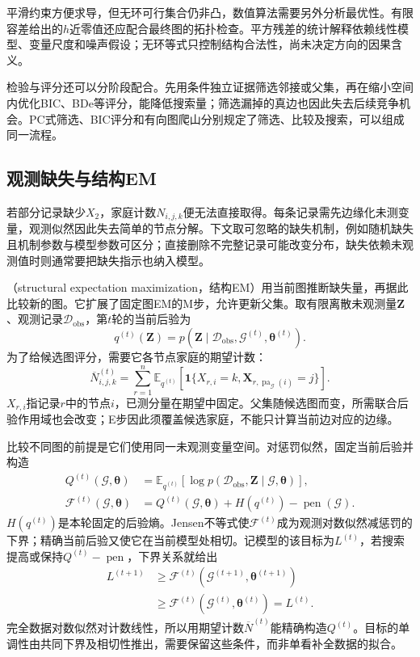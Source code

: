 平滑约束方便求导，但无环可行集合仍非凸，数值算法需要另外分析最优性。有限容差给出的$h$近零值还应配合最终图的拓扑检查。平方残差的统计解释依赖线性模型、变量尺度和噪声假设；无环等式只控制结构合法性，尚未决定方向的因果含义。

检验与评分还可以分阶段配合。先用条件独立证据筛选邻接或父集，再在缩小空间内优化BIC、BDe等评分，能降低搜索量；筛选漏掉的真边也因此失去后续竞争机会。PC式筛选、BIC评分和有向图爬山分别规定了筛选、比较及搜索，可以组成同一流程。

\subsection{观测缺失与结构EM}
\label{sec:pgm-structure-learning-structural-em}

若部分记录缺少$X_2$，家庭计数$N_{i,j,k}$便无法直接取得。每条记录需先边缘化未测变量，观测似然因此失去简单的节点分解。下文取可忽略的缺失机制，例如随机缺失且机制参数与模型参数可区分；直接删除不完整记录可能改变分布，缺失依赖未观测值时则通常要把缺失指示也纳入模型。

（structural expectation maximization，结构EM）用当前图推断缺失量，再据此比较新的图。它扩展了固定图EM的M步，允许更新父集。取有限离散未观测量$\bm{Z}$、观测记录$\mathcal{D}_{\mathrm{obs}}$，第$t$轮的当前后验为
\[
  q^{(t)}(\bm{Z})
  =p(\bm{Z}\mid\mathcal{D}_{\mathrm{obs}},
                  \mathcal{G}^{(t)},\bm{\theta}^{(t)}).
\]
为了给候选图评分，需要它各节点家庭的期望计数：
\[
  \overline N_{i,j,k}^{(t)}
  =\sum_{r=1}^{n}
    \mathbb{E}_{q^{(t)}}\!
      \left[\mathbf{1}\{X_{r,i}=k,
        \bm{X}_{r,\operatorname{pa}_{\mathcal{G}}(i)}=j\}\right].
\]
$X_{r,i}$指记录$r$中的节点$i$，已测分量在期望中固定。父集随候选图而变，所需联合后验作用域也会改变；E步因此须覆盖候选家庭，不能只计算当前边对应的边缘。

比较不同图的前提是它们使用同一未观测变量空间。对惩罚似然，固定当前后验并构造
\begin{equation}
  \begin{aligned}
    Q^{(t)}(\mathcal{G},\bm{\theta})
      &=\mathbb{E}_{q^{(t)}}[
          \log p(\mathcal{D}_{\mathrm{obs}},\bm{Z}
                     \mid\mathcal{G},\bm{\theta})],\\
    \mathcal{F}^{(t)}(\mathcal{G},\bm{\theta})
      &=Q^{(t)}(\mathcal{G},\bm{\theta})+H(q^{(t)})
        -\operatorname{pen}(\mathcal{G}).
  \end{aligned}
  \label{eq:pgm-structure-learning-sem-bound}
\end{equation}
$H(q^{(t)})$是本轮固定的后验熵。Jensen不等式使$\mathcal{F}^{(t)}$成为观测对数似然减惩罚的下界；精确当前后验又使它在当前模型处相切。记模型的该目标为$L^{(t)}$，若搜索提高或保持$Q^{(t)}-\operatorname{pen}$，下界关系就给出
\[
  \begin{aligned}
    L^{(t+1)}
    &\geq \mathcal{F}^{(t)}(\mathcal{G}^{(t+1)},\bm{\theta}^{(t+1)})\\
    &\geq \mathcal{F}^{(t)}(\mathcal{G}^{(t)},\bm{\theta}^{(t)})
     =L^{(t)}.
  \end{aligned}
\]
完全数据对数似然对计数线性，所以用期望计数$\overline N^{(t)}$能精确构造$Q^{(t)}$。目标的单调性由共同下界及相切性推出，需要保留这些条件，而非单看补全数据的拟合。

